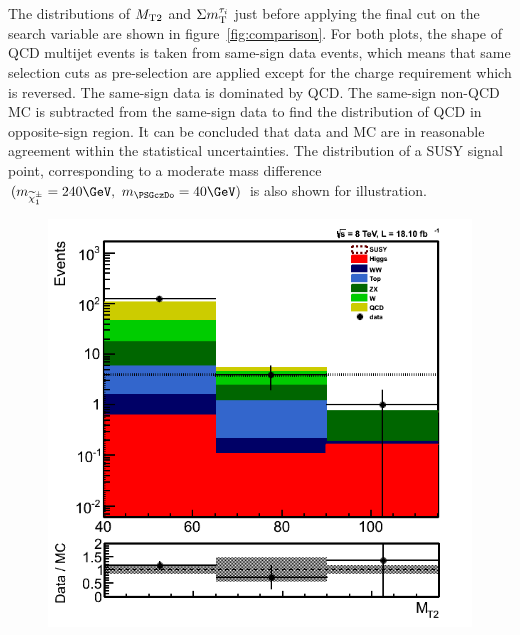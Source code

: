 The distributions of ${M_{\rm T2}}$ and $\Sigma m_{\rm T}^{\tau_i}$ just before applying the final cut on the search variable 
are shown in figure~\ref{fig:comparison}. 
For both plots, the shape of QCD multijet events
is taken from same-sign data events, which means that same selection cuts as pre-selection are applied except for the charge
requirement which is reversed. The same-sign data is dominated by QCD. The same-sign non-QCD MC is subtracted from the same-sign data to
find the distribution of QCD in opposite-sign region.   
 It can be concluded that data and MC are in reasonable agreement within the statistical uncertainties. The distribution of a SUSY signal point, 
corresponding to a moderate mass difference $(m_{\chione}=240\GeV,~m_{\PSGczDo}=40\GeV)$ is also shown for illustration.
\begin{figure}[!Hhtb]
\centering
\includegraphics[angle=0,scale=0.35]{TauTauFigs/MT2_SSQCD_dataunblinding.png}

\end{figure}
